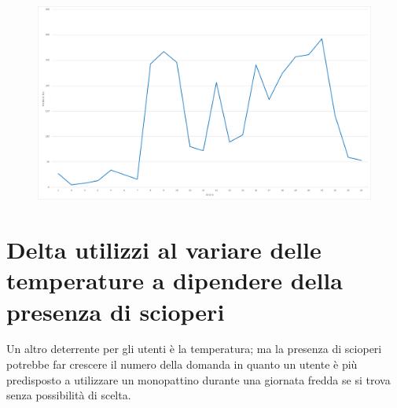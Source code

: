 \begin{figure}[H]                                                                                                                                                            
\centering                                                                                                                                                                   
\includegraphics[width=\textwidth]{images/result3}                                                                                                                                   
\label{fig:result3}                                                                                                                                                           
\end{figure}


\section{Delta utilizzi al variare delle temperature a dipendere della presenza di scioperi}
Un altro deterrente per gli utenti è la temperatura; ma la presenza di scioperi potrebbe
far crescere il numero della domanda in quanto un utente è più predisposto a utilizzare un 
monopattino durante una giornata fredda se si trova senza possibilità di scelta.

